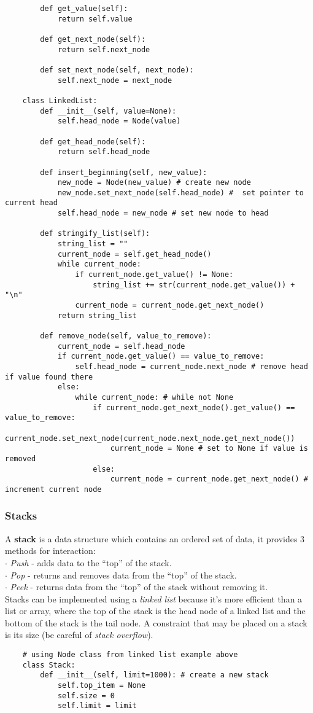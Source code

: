 \documentclass[11pt, a4paper]{article}
\begin{document}
\begin{spacing}{1.1}
\begin{lstlisting}
		def get_value(self):
			return self.value
			
		def get_next_node(self):
			return self.next_node
			
		def set_next_node(self, next_node):
			self.next_node = next_node
	
	class LinkedList:
		def __init__(self, value=None):
			self.head_node = Node(value)
		
		def get_head_node(self):
			return self.head_node
		
		def insert_beginning(self, new_value):
			new_node = Node(new_value) # create new node
			new_node.set_next_node(self.head_node) #  set pointer to current head
			self.head_node = new_node # set new node to head
		
		def stringify_list(self):
			string_list = ""
			current_node = self.get_head_node()
			while current_node:
				if current_node.get_value() != None:
					string_list += str(current_node.get_value()) + "\n"
				current_node = current_node.get_next_node()
			return string_list
		
		def remove_node(self, value_to_remove):
			current_node = self.head_node
			if current_node.get_value() == value_to_remove:
				self.head_node = current_node.next_node # remove head if value found there
			else:
				while current_node: # while not None
					if current_node.get_next_node().get_value() == value_to_remove:
						current_node.set_next_node(current_node.next_node.get_next_node())
						current_node = None # set to None if value is removed
					else:
						current_node = current_node.get_next_node() # increment current node \end{lstlisting}\newpage
	\subsubsection{Stacks}
	A \textbf{stack} is a data structure which contains an ordered set of data, it provides 3 methods for interaction: \\
	\hspace*{1.5mm} $\cdot$ \textit{Push} - adds data to the “top” of the stack. \\
	\hspace*{1.5mm} $\cdot$ \textit{Pop} - returns and removes data from the “top” of the stack. \\
	\hspace*{1.5mm} $\cdot$ \textit{Peek} - returns data from the “top” of the stack without removing it. \\
	Stacks can be implemented using a \textit{linked list} because it’s more efficient than a list or array, where the top of the stack is the head node of a linked list and the bottom of the stack is the tail node. A constraint that may be placed on a stack is its size (be careful of \textit{stack overflow}).
	\begin{lstlisting}
	# using Node class from linked list example above
	class Stack:
		def __init__(self, limit=1000): # create a new stack
			self.top_item = None
			self.size = 0
			self.limit = limit
		

\end{lstlisting}
\end{spacing}
\end{document}
